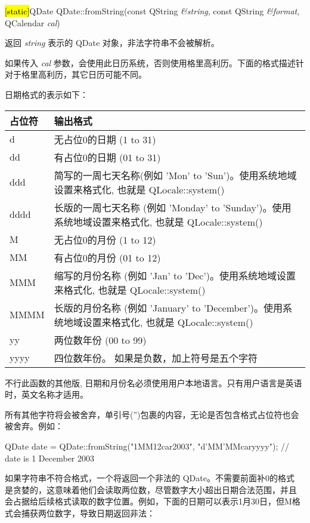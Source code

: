 \hl{[static]}QDate QDate::fromString(const QString \emph{\&string}, const QString \emph{\&format}, QCalendar \emph{cal})

返回 \emph{string}  表示的 QDate 对象，非法字符串不会被解析。

如果传入 \emph{cal} 参数，会使用此日历系统，否则使用格里高利历。下面的格式描述针对于格里高利历，其它日历可能不同。

日期格式的表示如下：

\begin{tabular}{|l|l|}
\hline
占位符&	输出格式\\
\hline
d&	无占位0的日期 (1 to 31)\\
\hline
dd&	有占位0的日期 (01 to 31)\\
\hline
ddd&	简写的一周七天名称(例如 'Mon' to 'Sun')。使用系统地域设置来格式化, 也就是 QLocale::system()\\
\hline
dddd&	长版的一周七天名称 (例如 'Monday' to 'Sunday')。使用系统地域设置来格式化, 也就是 QLocale::system()\\
\hline
M&	无占位0的月份 (1 to 12)\\
\hline
MM&	有占位0的月份 (01 to 12)\\
\hline
MMM&	缩写的月份名称 (例如 'Jan' to 'Dec')。使用系统地域设置来格式化, 也就是 QLocale::system()\\
\hline
MMMM&	长版的月份名称 (例如 'January' to 'December')。使用系统地域设置来格式化, 也就是 QLocale::system()\\
\hline
yy&	两位数年份 (00 to 99)\\
\hline
yyyy&	四位数年份。 如果是负数，加上符号是五个字符\\
\hline
\end{tabular}

\begin{notice}
 不行此函数的其他版, 日期和月份名必须使用用户本地语言。只有用户语言是英语时，英文名称才适用。
\end{notice}

所有其他字符将会被舍弃，单引号('')包裹的内容，无论是否包含格式占位符也会被舍弃。例如：

\begin{cppcode}
QDate date = QDate::fromString("1MM12car2003", "d'MM'MMcaryyyy");
// date is 1 December 2003
\end{cppcode}

如果字符串不符合格式，一个将返回一个非法的 QDate。不需要前面补0的格式
是贪婪的，这意味着他们会读取两位数，尽管数字大小超出日期合法范围，并且
会占据给后续格式读取的数字位置。例如，下面的日期可以表示1月30日，但M格
式会捕获两位数字，导致日期返回非法：

